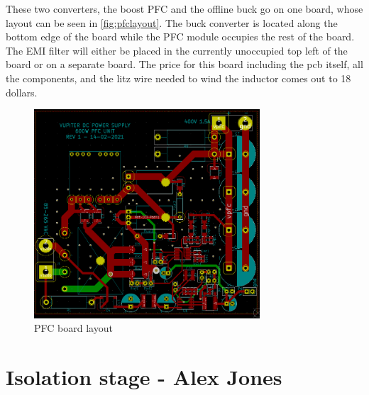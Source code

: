 \documentclass[12pt]{article}
\begin{document}
These two converters, the boost PFC and the offline buck go on one board, whose layout can be seen in \autoref{fig:pfclayout}. The buck converter is located along the bottom edge of the board while the PFC module occupies the rest of the board. The EMI filter will either be placed in the currently unoccupied top left of the board or on a separate board. The price for this board including the pcb itself, all the components, and the litz wire needed to wind the inductor comes out to 18 dollars.\\
\begin{figure}[H]
    \centering
        \includegraphics[width=0.75\textwidth]{pfclayout}
        \caption{PFC board layout}
        \label{fig:pfclayout}
    \centering
\end{figure}

\section{Isolation stage  - Alex Jones}
\end{document}
